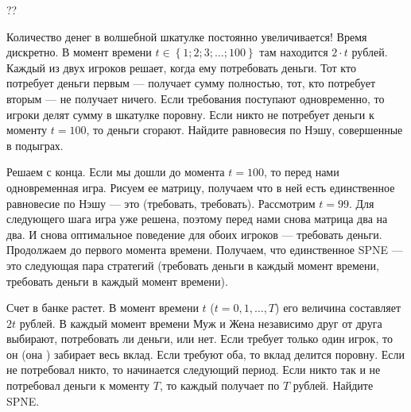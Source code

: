 \begin{problem}
\begin{source}
\cite[2.111]{osborne:igt}??
\end{source}
Количество денег в волшебной шкатулке постоянно увеличивается! Время дискретно. В момент времени  $t\in \left\{1;2;3;\ldots ;100\right\}$  там находится  $2\cdot t$  рублей. Каждый из двух игроков решает, когда ему потребовать деньги. Тот кто потребует деньги первым --- получает сумму полностью, тот, кто потребует вторым --- не получает ничего. Если требования поступают одновременно, то игроки делят сумму в шкатулке поровну. Если никто не потребует деньги к моменту  $t=100$, то деньги сгорают. Найдите равновесия по Нэшу, совершенные в подыграх.\par

\begin{sol}
Решаем с конца. Если мы дошли до момента $t=100$, то перед нами одновременная игра. Рисуем ее матрицу, получаем что в ней есть единственное равновесие по Нэшу --- это (требовать, требовать). Рассмотрим $t=99$. Для следующего шага игра уже решена, поэтому перед нами снова матрица два на два. И снова оптимальное поведение для обоих игроков --- требовать деньги. Продолжаем до первого момента времени. Получаем, что единственное SPNE --- это следующая пара стратегий (требовать деньги в каждый момент времени, требовать деньги в каждый момент времени).
\end{sol}
\end{problem}






\begin{problem}
 Счет в банке растет. В момент времени $t$ ($t=0,1,\ldots,T$) его
величина составляет $2t$ рублей. В каждый момент времени Муж и
Жена независимо друг от друга выбирают, потребовать ли деньги, или
нет. Если требует только один игрок, то он (она ) забирает весь
вклад. Если требуют оба, то вклад делится поровну. Если не
потребовал никто, то начинается следующий период. Если никто так и
не потребовал деньги к моменту $T$, то каждый получает по $T$
рублей. Найдите SPNE.

\begin{sol}

\end{sol}
\end{problem}




